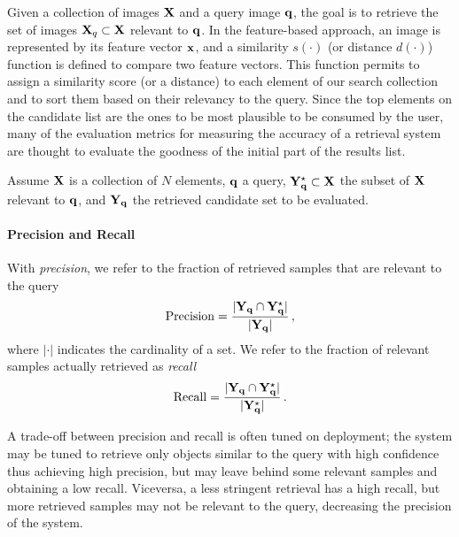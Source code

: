Given a collection of images $\mathbf{X}$ and a query image $\mathbf{q}$, the goal is to retrieve the set of images $\mathbf{X}_q \subset \mathbf{X}$ relevant to $\mathbf{q}$.
In the feature-based approach, an image is represented by its feature vector $\mathbf{x}$, and a similarity $s(\cdot)$ (or distance $d(\cdot)$) function is defined to compare two feature vectors.
This function permits to assign a similarity score (or a distance) to each element of our search collection and to sort them based on their relevancy to the query.
Since the top elements on the candidate list are the ones to be most plausible to be consumed by the user, many of the evaluation metrics for measuring the accuracy of a retrieval system are thought to evaluate the goodness of the initial part of the results list.

Assume $\mathbf{X}$ %
is a collection of $N$ elements, $\mathbf{q}$ a query, $\mathbf{Y}^{\star}_{\mathbf{q}} \subset \mathbf{X}$ the subset of $\mathbf{X}$ relevant to $\mathbf{q}$, and $\mathbf{Y}_{\mathbf{q}}$ the retrieved candidate set to be evaluated.
\paragraph{Precision and Recall}
With \emph{precision}, we refer to the fraction of retrieved samples that are relevant to the query
\begin{equation} \label{eq:back:precision}
\mathrm{Precision} = \frac{|\mathbf{Y}_{\mathbf{q}} \cap \mathbf{Y}^{\star}_{\mathbf{q}}|}{|\mathbf{Y}_{\mathbf{q}}|} \,,
\end{equation}
where $|\cdot|$ indicates the cardinality of a set.
We refer to the fraction of relevant samples actually retrieved as \emph{recall}
\begin{equation} \label{eq:back:recall}
\mathrm{Recall} = \frac{|\mathbf{Y}_{\mathbf{q}} \cap \mathbf{Y}^{\star}_{\mathbf{q}}|}{|\mathbf{Y}^{\star}_{\mathbf{q}}|} \,.
\end{equation}

A trade-off between precision and recall is often tuned on deployment;
the system may be tuned to retrieve only objects similar to the query with high confidence thus achieving high precision, but may leave behind some relevant samples and obtaining a low recall.
Viceversa, a less stringent retrieval has a high recall, but more retrieved samples may not be relevant to the query, decreasing the precision of the system.

